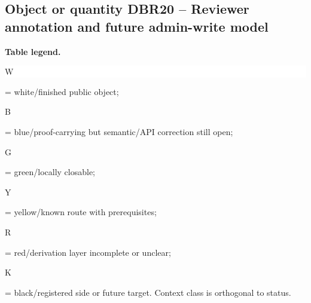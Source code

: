 \subsection*{Object or quantity DBR20 -- Reviewer annotation and future admin-write model}
\hypertarget{objproof:DBR20}{}
\par\smallskip\noindent\begin{minipage}{0.99\linewidth}\footnotesize\raggedright\textbf{Table legend.} \colorbox{white}{\strut W} = white/finished public object; \colorbox{cyan!20}{\strut B} = blue/proof-carrying but semantic/API correction still open; \colorbox{green!18}{\strut G} = green/locally closable; \colorbox{yellow!25}{\strut Y} = yellow/known route with prerequisites; \colorbox{red!20}{\strut R} = red/derivation layer incomplete or unclear; \colorbox{black!18}{\strut K} = black/registered side or future target. Context class is orthogonal to status.\end{minipage}\par\vspace{0.25em}
